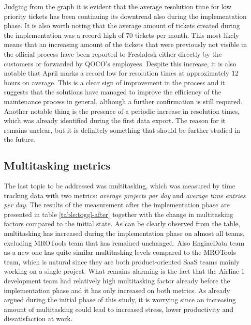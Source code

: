 Judging from the graph it is evident that the average resolution time for low priority tickets has been continuing its downtrend also during the implementation phase. It is also worth noting that the average
amount of tickets created during the implementation was a record high of 70 tickets per month. This most likely means that an increasing amount of the tickets that were previously not visible in the official
process have been reported to Freshdesk either directly by the customers or forwarded by QOCO's employees. Despite this increase, it is also notable that April marks a record low for resolution times 
at approximately 12 hours on average. This is a clear sign of improvement in the process and it suggests that the solutions have managed to improve the efficiency of the maintenance process in general,
although a further confirmation is still required. Another notable thing is the presence of a periodic increase in resolution times, which was already identified during the first data export. The reason for it
remains unclear, but it is definitely something that should be further studied in the future.

\subsection{Multitasking metrics}

The last topic to be addressed was multitasking, which was measured by time tracking data with two metrics: \emph{average projects per day} and \emph{average time entries per day}. The results of the
measurement after the implementation phase are presented in table \ref{table:toggl-after} together with the change in multitasking factors compared to the initial state. As can be clearly observed from
the table, multitasking has increased during the implementation phase on almost all teams, excluding MROTools team that has remained unchanged. Also EngineData team as a new one has quite similar
multitasking levels compared to the MROTools team, which is natural since they are both product-oriented SaaS teams mainly working on a single project. What remains alarming is the fact that the Airline 1
development team had relatively high multitasking factor already before the implementation phase and it has only increased on both metrics. As already argued during the initial
phase of this study, it is worrying since an increasing amount of multitasking could lead to increased stress, lower productivity and dissatisfaction at work.

